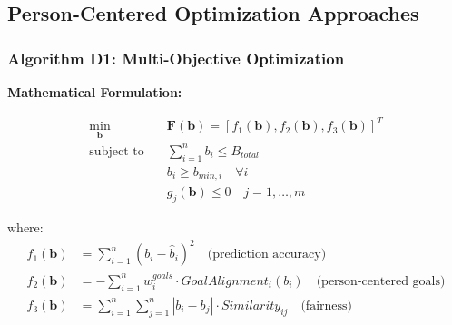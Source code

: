 \documentclass[12pt]{article}
\begin{document}
\subsection{Person-Centered Optimization Approaches}

\subsubsection{Algorithm D1: Multi-Objective Optimization}

\textbf{Mathematical Formulation:}

\begin{align}
\min_{\mathbf{b}} \quad & \mathbf{F}(\mathbf{b}) = [f_1(\mathbf{b}), f_2(\mathbf{b}), f_3(\mathbf{b})]^T \\
\text{subject to} \quad & \sum_{i=1}^n b_i \leq B_{total} \\
& b_i \geq b_{min,i} \quad \forall i \\
& g_j(\mathbf{b}) \leq 0 \quad j = 1, \ldots, m
\end{align}

where:
\begin{align}
f_1(\mathbf{b}) &= \sum_{i=1}^n (b_i - \hat{b}_i)^2 \quad \text{(prediction accuracy)} \\
f_2(\mathbf{b}) &= -\sum_{i=1}^n w_i^{goals} \cdot GoalAlignment_i(b_i) \quad \text{(person-centered goals)} \\
f_3(\mathbf{b}) &= \sum_{i=1}^n \sum_{j=1}^n |b_i - b_j| \cdot Similarity_{ij} \quad \text{(fairness)}
\end{align}
\end{document}
